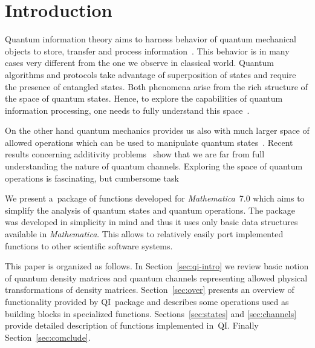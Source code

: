 \documentclass[final,5p,times,twocolumn]{elsarticle}
\newcommand{\Mathematica}{\emph{Mathematica}}
\newcommand{\1}{{\rm 1\hspace{-0.9mm}l}}
\newcommand{\qi}{QI}
\begin{document}

\section{Introduction}\label{sec:intro}
Quantum information theory aims to harness behavior of quantum mechanical
objects to store, transfer and process information~\cite{hayashi}. This behavior
is in many cases very different from the one we observe in classical world.
Quantum algorithms and protocols take advantage of superposition of states and
require the presence of entangled states. Both phenomena arise from the rich
structure of the space of quantum states. Hence, to explore the capabilities of
quantum information processing, one needs to fully understand this
space~\cite{BZ06}. 

On the other hand quantum mechanics provides us also with much larger space of
allowed operations which can be used to manipulate quantum states~\cite{BZ06}.
Recent results concerning additivity problems~\cite{hastings09superadditivity}
show that we are far from full understanding the nature of quantum channels.
Exploring the space of quantum operations is fascinating, but cumbersome
task~\cite{ruskai02analysis}


We present a~package of functions developed for \Mathematica\ 7.0 which aims to
simplify the analysis of quantum states and quantum operations. The package was 
developed in simplicity in mind and thus it uses only basic data structures
available in \Mathematica. This allows to relatively easily port implemented
functions to other scientific software systems.

This paper is organized as follows. In Section~\ref{sec:qi-intro} we review
basic notion of quantum density matrices and quantum channels representing
allowed physical transformations of density matrices. Section~\ref{sec:over}
presents an overview of functionality provided by \qi\ package and describes
some operations used as building blocks in specialized functions.
Sections~\ref{sec:states} and \ref{sec:channels} provide detailed description of
functions implemented in~\qi. Finally Section~\ref{sec:comclude}.
\end{document}
